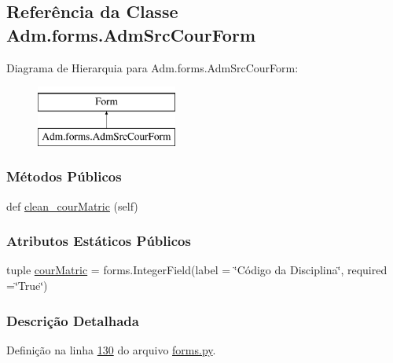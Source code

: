 \hypertarget{classAdm_1_1forms_1_1AdmSrcCourForm}{}\subsection{Referência da Classe Adm.\+forms.\+Adm\+Src\+Cour\+Form}
\label{classAdm_1_1forms_1_1AdmSrcCourForm}
Diagrama de Hierarquia para Adm.\+forms.\+Adm\+Src\+Cour\+Form\+:\begin{figure}[H]
\begin{center}
\leavevmode
\includegraphics[height=2.000000cm]{de/d02/classAdm_1_1forms_1_1AdmSrcCourForm}
\end{center}
\end{figure}
\subsubsection*{Métodos Públicos}
\begin{DoxyCompactItemize}
\item 
def \hyperlink{classAdm_1_1forms_1_1AdmSrcCourForm_a65d37d8a99e8ff4ed69e2f62268810af}{clean\+\_\+cour\+Matric} (self)
\end{DoxyCompactItemize}
\subsubsection*{Atributos Estáticos Públicos}
\begin{DoxyCompactItemize}
\item 
tuple \hyperlink{classAdm_1_1forms_1_1AdmSrcCourForm_ad1687195ebe49268ac1cccbcaab2cd83}{cour\+Matric} = forms.\+Integer\+Field(label = \char`\"{}Código da Disciplina\char`\"{}, required =\char`\"{}True\char`\"{})
\end{DoxyCompactItemize}


\subsubsection{Descrição Detalhada}


Definição na linha \hyperlink{Adm_2forms_8py_source_l00130}{130} do arquivo \hyperlink{Adm_2forms_8py_source}{forms.\+py}.



